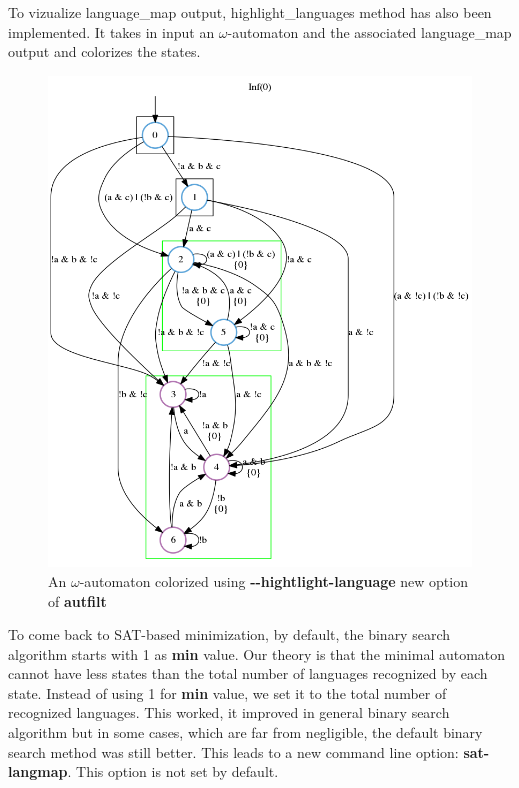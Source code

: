 To vizualize language\_map output, highlight\_languages method has also been implemented. It takes in input
an $\omega$-automaton and the associated language\_map output and colorizes the states.\\

\begin{figure}[h]
 \centering
 \includegraphics[scale=0.6]{img/highlight_language.png}
 \caption{An $\omega$-automaton colorized using \textbf{-{}-hightlight-language} new option of
          \textbf{autfilt}}
 \label{fig:highlight_language}
\end{figure}

To come back to SAT-based minimization, by default, the binary search algorithm starts with 1 as
\textbf{min} value. Our theory is that the minimal automaton cannot have less states than the total number
of languages recognized by each state. Instead of using 1 for \textbf{min} value, we set it to the total
number of recognized languages. This worked, it improved in general binary search algorithm but in some
cases, which are far from negligible, the default binary search method was still better. This leads to a
new command line option: \textbf{sat-langmap}. This option is not set by default.
